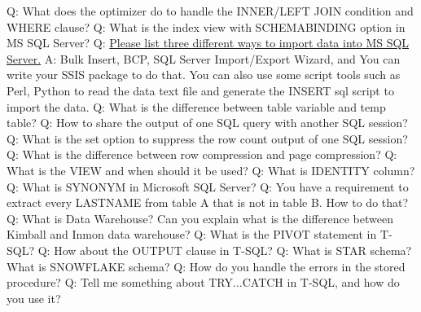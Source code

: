 \documentclass[a4paper,11pt]{article}
\begin{document}
\noindent 
Q: What does the optimizer do to handle the INNER/LEFT JOIN condition and WHERE clause? \newline \newline
\noindent 
Q: What is the index view with SCHEMABINDING option in MS SQL Server? \newline \newline
\noindent 
Q: \ul{Please list three different ways to import data into MS SQL Server.} \newline
A: Bulk Insert, BCP, SQL Server Import/Export Wizard, and You can write your SSIS package to do that. You can also use some script tools such as Perl, Python to read the data text file and generate the INSERT sql script to import the data.\newline\newline
\noindent 
Q: What is the difference between table variable and temp table? \newline \newline
\noindent 
Q: How to share the output of one SQL query with another SQL session? \newline \newline
\noindent 
Q: What is the set option to suppress the row count output of one SQL session? \newline \newline
\noindent 
Q: What is the difference between row compression and page compression? \newline \newline
\noindent 
Q: What is the VIEW and when should it be used? \newline \newline
\noindent 
Q: What is IDENTITY column? \newline \newline
\noindent 
Q: What is SYNONYM in Microsoft SQL Server? \newline \newline
\noindent 
Q: You have a requirement to extract every LASTNAME from table A that is not in table B. How to do that? \newline \newline
\noindent 
Q: What is Data Warehouse? Can you explain what is the difference between Kimball and Inmon data warehouse? \newline \newline
\noindent 
Q: What is the PIVOT statement in T-SQL? \newline \newline
\noindent 
Q: How about the OUTPUT clause in T-SQL? \newline \newline
\noindent 
Q: What is STAR schema? What is SNOWFLAKE schema? \newline \newline
\noindent 
Q: How do you handle the errors in the stored procedure? \newline \newline
\noindent 
Q: Tell me something about TRY...CATCH in T-SQL, and how do you use it? \newline \newline
\end{document}
